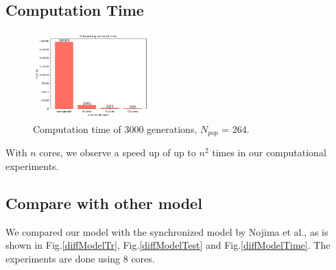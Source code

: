 \documentclass[conference]{IEEEtran}
\begin{document}
\subsection{Computation Time}
\begin{figure}[H]
  \centering
  \includegraphics[width=0.4\textwidth]{figures/diffTime.png}
  \caption{Computation time of 3000 generations, $N_{pop}$ = 264.}\label{phT}
\end{figure}
With $n$ cores, we observe a speed up of up to $n^2$ times in our computational experiments.

\subsection{Compare with other model}
We compared our model with the synchronized model by Nojima et al.\cite{nojima2015application}, as is shown in Fig.\ref{diffModelTr}, Fig.\ref{diffModelTest} and Fig.\ref{diffModelTime}. The experiments are done using 8 cores.
\end{document}
